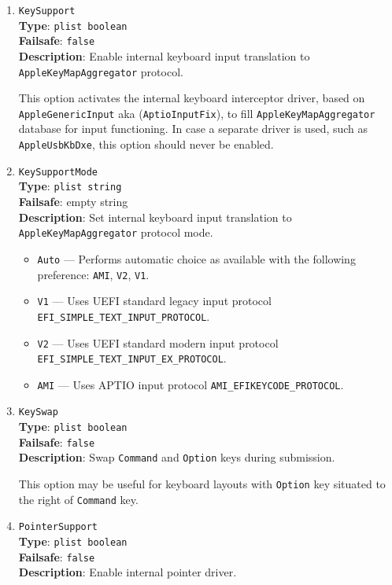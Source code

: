 \documentclass[]{article}
\providecommand{\tightlist}{%
  \setlength{\itemsep}{0pt}\setlength{\parskip}{0pt}}
\begin{document}
\begin{enumerate}
\item
  \texttt{KeySupport}\\
  \textbf{Type}: \texttt{plist\ boolean}\\
  \textbf{Failsafe}: \texttt{false}\\
  \textbf{Description}: Enable internal keyboard input translation to
  \texttt{AppleKeyMapAggregator} protocol.

  This option activates the internal keyboard interceptor driver, based on
  \texttt{AppleGenericInput} aka (\texttt{AptioInputFix}), to fill
  \texttt{AppleKeyMapAggregator} database for input functioning. In case
  a separate driver is used, such as \texttt{AppleUsbKbDxe}, this option
  should never be enabled.

\item
  \texttt{KeySupportMode}\\
  \textbf{Type}: \texttt{plist\ string}\\
  \textbf{Failsafe}: empty string\\
  \textbf{Description}: Set internal keyboard input translation to
  \texttt{AppleKeyMapAggregator} protocol mode.

  \begin{itemize}
  \tightlist
  \item \texttt{Auto} --- Performs automatic choice as available with the following preference: \texttt{AMI}, \texttt{V2}, \texttt{V1}.
  \item \texttt{V1} --- Uses UEFI standard legacy input protocol \texttt{EFI\_SIMPLE\_TEXT\_INPUT\_PROTOCOL}.
  \item \texttt{V2} --- Uses UEFI standard modern input protocol \texttt{EFI\_SIMPLE\_TEXT\_INPUT\_EX\_PROTOCOL}.
  \item \texttt{AMI} --- Uses APTIO input protocol \texttt{AMI\_EFIKEYCODE\_PROTOCOL}.
  \end{itemize}

\item
  \texttt{KeySwap}\\
  \textbf{Type}: \texttt{plist\ boolean}\\
  \textbf{Failsafe}: \texttt{false}\\
  \textbf{Description}: Swap \texttt{Command} and \texttt{Option} keys during submission.

  This option may be useful for keyboard layouts with \texttt{Option} key situated to the right
  of \texttt{Command} key.

\item
  \texttt{PointerSupport}\\
  \textbf{Type}: \texttt{plist\ boolean}\\
  \textbf{Failsafe}: \texttt{false}\\
  \textbf{Description}: Enable internal pointer driver.


\end{enumerate}
\end{document}
